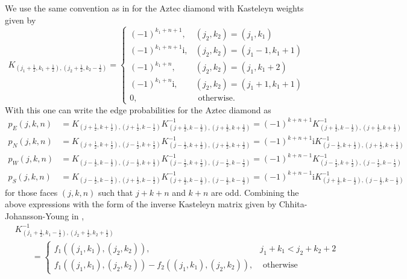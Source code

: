 \documentclass[12pt]{amsart}
\numberwithin{equation}{section}
\theoremstyle{definition}
\begin{document}
We use the same convention as in \cite{tower_AD_perfect} for the Aztec diamond with Kasteleyn weights given by 
\begin{equation}
K_{\left(j_1+\frac{1}{2}, k_1+\frac{1}{2}\right),\left(j_2+\frac{1}{2}, k_2-\frac{1}{2}\right)}= \begin{cases}(-1)^{k_1+n+1}, & \left(j_2, k_2\right)=\left(j_1, k_1\right) \\ (-1)^{k_1+n+1} \mathrm{i}, & \left(j_2, k_2\right)=\left(j_1-1, k_1+1\right) \\ (-1)^{k_1+n}, & \left(j_2, k_2\right)=\left(j_1, k_1+2\right) \\ (-1)^{k_1+n}\mathrm{i}, & \left(j_2, k_2\right)=\left(j_1+1, k_1+1\right) \\ 0, & \text { otherwise. }\end{cases}
\end{equation}
With this one can write the edge probabilities for the Aztec diamond as 
\begin{equation}\begin{aligned}
    p_E(j,k,n)&=K_{(j+\frac{1}{2},k+\frac{1}{2}),(j+\frac{1}{2},k-\frac{1}{2})}K^{-1}_{(j+\frac{1}{2},k-\frac{1}{2}),(j+\frac{1}{2},k+\frac{1}{2})}=(-1)^{k+n+1}K^{-1}_{(j+\frac{1}{2},k-\frac{1}{2}),(j+\frac{1}{2},k+\frac{1}{2})}\\
    p_N(j,k,n)&=K_{(j+\frac{1}{2},k+\frac{1}{2}),(j-\frac{1}{2},k+\frac{1}{2})}K^{-1}_{(j-\frac{1}{2},k+\frac{1}{2}),(j+\frac{1}{2},k+\frac{1}{2})}=(-1)^{k+n+1} \mathrm{i}K^{-1}_{(j-\frac{1}{2},k+\frac{1}{2}),(j+\frac{1}{2},k+\frac{1}{2})}\\
    p_W(j,k,n)&=K_{(j-\frac{1}{2},k-\frac{1}{2}),(j-\frac{1}{2},k+\frac{1}{2})}K^{-1}_{(j-\frac{1}{2},k+\frac{1}{2}),(j-\frac{1}{2},k-\frac{1}{2})}=(-1)^{k+n-1}K^{-1}_{(j-\frac{1}{2},k+\frac{1}{2}),(j-\frac{1}{2},k-\frac{1}{2})}\\
    p_S(j,k,n)&=K_{(j-\frac{1}{2},k-\frac{1}{2}),(j+\frac{1}{2},k-\frac{1}{2})}K^{-1}_{(j+\frac{1}{2},k-\frac{1}{2}),(j-\frac{1}{2},k-\frac{1}{2})}=(-1)^{k+n-1}\mathrm{i}K^{-1}_{(j+\frac{1}{2},k-\frac{1}{2}),(j-\frac{1}{2},k-\frac{1}{2})}
\end{aligned}  
\end{equation}
for those faces $(j,k,n)$ such that $j+k+n$ and $k+n$ are odd. Combining the above expressions with the form of the inverse Kasteleyn matrix given by Chhita-Johansson-Young in  \cite{MR3325273},
$$
\begin{aligned}
& K_{\left(j_1+\frac{1}{2}, k_1-\frac{1}{2}\right),\left(j_2+\frac{1}{2}, k_2+\frac{1}{2}\right)}^{-1} \\
& \qquad= \begin{cases}f_1\left(\left(j_1, k_1\right),\left(j_2, k_2\right)\right), & j_1+k_1<j_2+k_2+2 \\
f_1\left(\left(j_1, k_1\right),\left(j_2, k_2\right)\right)-f_2\left(\left(j_1, k_1\right),\left(j_2, k_2\right)\right), & \text { otherwise }\end{cases}
\end{aligned}
$$
\end{document}
